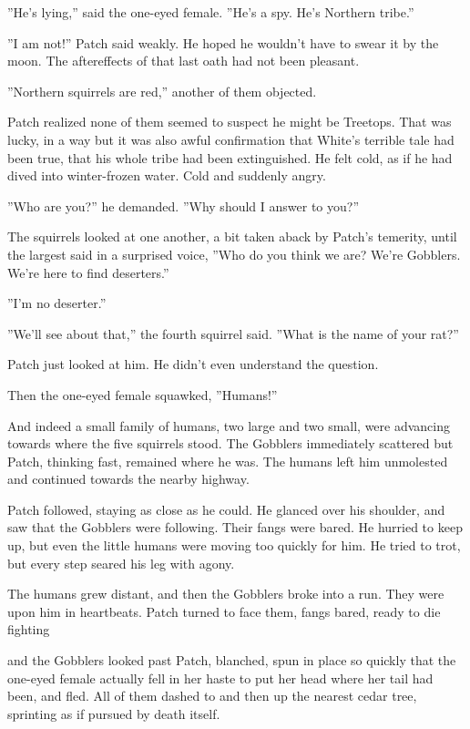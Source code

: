 \documentclass[12pt]{book}
\begin{document}
''He's lying,'' said the one-eyed female. ''He's a spy. He's Northern tribe.''

''I am not!'' Patch said weakly. He hoped he wouldn't have to swear it by the moon. The aftereffects of that last oath had not been pleasant. 

''Northern squirrels are red,'' another of them objected.

Patch realized none of them seemed to suspect he might be Treetops. That was lucky, in a way %
but it was also awful confirmation that White's terrible tale had been true, that his whole tribe had been extinguished. He felt cold, as if he had dived into winter-frozen water. Cold and suddenly angry.

''Who are you?'' he demanded. ''Why should I answer to you?''

The squirrels looked at one another, a bit taken aback by Patch's temerity, until the largest said in a surprised voice, ''Who do you think we are? We're Gobblers. We're here to find deserters.''

''I'm no deserter.''

''We'll see about that,'' the fourth squirrel said. ''What is the name of your rat?''

Patch just looked at him. He didn't even understand the question.

Then the one-eyed female squawked, ''Humans!''

And indeed a small family of humans, two large and two small, were advancing towards where the five squirrels stood. The Gobblers immediately scattered %
but Patch, thinking fast, remained where he was. The humans left him unmolested and continued towards the nearby highway.

Patch followed, staying as close as he could. He glanced over his shoulder, and saw that the Gobblers were following. Their fangs were bared. He hurried to keep up, but even the little humans were moving too quickly for him. He tried to trot, but every step seared his leg with agony.

The humans grew distant, and then the Gobblers broke into a run. They were upon him in heartbeats. Patch turned to face them, fangs bared, ready to die fighting %

and the Gobblers looked past Patch, blanched, spun in place so quickly that the one-eyed female actually fell in her haste to put her head where her tail had been, and fled. All of them dashed to and then up the nearest cedar tree, sprinting as if pursued by death itself.
\end{document}
